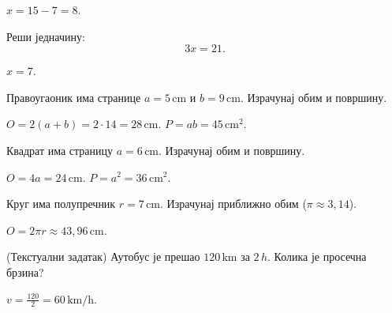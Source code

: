 \documentclass[11pt,a5paper,twoside,addpoints,noanswers]{exam} %
\begin{document}
\begin{questions}
\begin{solution}[\stretch 1]
$x=15-7=8$.
\end{solution}

\question[8]
Реши једначину:
\[
3x=21.
\]

\begin{solution}[\stretch 1]
$x=7$.
\end{solution}

\ifprintanswers\else\newpage\fi

\question[8]
Правоугаоник има странице $a=5\,\text{cm}$ и $b=9\,\text{cm}$.  
Израчунај обим и површину.

\begin{solution}[\stretch 2]
$O=2(a+b)=2\cdot 14=28\,\text{cm}$.  
$P=ab=45\,\text{cm}^2$.
\end{solution}

\question[10]
Квадрат има страницу $a=6\,\text{cm}$.  
Израчунај обим и површину.

\begin{solution}[\stretch 2]
$O=4a=24\,\text{cm}$.  
$P=a^2=36\,\text{cm}^2$.
\end{solution}

\ifprintanswers\else\newpage\fi

\question[10]
Круг има полупречник $r=7\,\text{cm}$.  
Израчунај приближно обим ($\pi\approx3{,}14$).

\begin{solution}[\stretch 2]
$O=2\pi r \approx 43{,}96\,\text{cm}$.
\end{solution}

\question[10]
(Текстуални задатак) Аутобус је прешао $120\,\text{km}$ за $2\,h$.  
Колика је просечна брзина?

\begin{solution}[\stretch 2]
$v=\tfrac{120}{2}=60\,\text{km/h}$.
\end{solution}

\end{questions}
\end{document}
